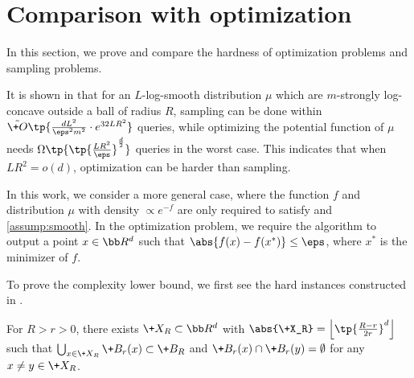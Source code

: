 \section{Comparison with optimization}\label{sec:sampling-vs-opt}
In this section, we prove  and compare the hardness of optimization problems and sampling problems.

It is shown in \cite{MCJ+19} that for an $L$-log-smooth distribution $\mu$ which are $m$-strongly log-concave outside a ball of radius $R$, sampling can be done within $\tilde{\+O}\tp{\frac{dL^2}{\eps^2 m^2}\cdot e^{32LR^2}}$ queries, while optimizing the potential function of $\mu$ needs $\Omega\tp{\tp{\frac{LR^2}{\eps}}^{\frac{d}{2}}}$ queries in the worst case. This indicates that when $LR^2 = o(d)$, optimization can be harder than sampling.


In this work, we consider a more general case, where the function $f$ and distribution $\mu$ with density $\propto e^{-f}$ are only required to satisfy  and \ref{assump:smooth}. In the optimization problem, we require the algorithm to output a point $x\in \bb R^d$ such that $\abs{f(x)-f(x^*)}\leq \eps$, where $x^*$ is the minimizer of $f$. 



To prove the complexity lower bound, we first see the hard instances constructed in \cite{MCJ+19}.
\begin{lemma}\label{lem:packing}
    For $R>r>0$, there exists $\+X_{R}\subset \bb R^d$ with $\abs{\+X_R}= \Big\lfloor \tp{\frac{R-r}{2r}}^d \Big\rfloor$ such that $\bigcup_{x\in \+X_R} \+B_r(x)\subset \+B_R$ and $\+B_r(x)\cap \+B_r(y) = \emptyset$ for any $x\neq y\in \+X_R$.
\end{lemma}

